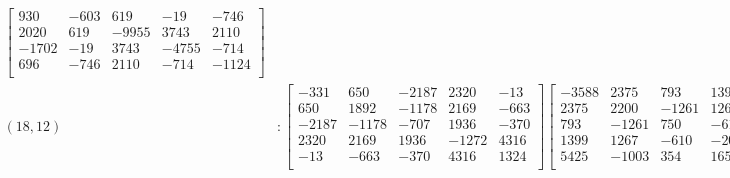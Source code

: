 \documentclass[12pt]{amsart}
\theoremstyle{plain}
\theoremstyle{definition}
\begin{document}
\begin{landscape}
\begin{align*}
\begin{bmatrix}
 930  &   -603  &   619  &   -19  &   -746  \\ 
 2020  &   619  &   -9955  &   3743  &   2110  \\ 
 -1702  &   -19  &   3743  &   -4755  &   -714  \\ 
 696  &   -746  &   2110  &   -714  &   -1124  \\ 
\end{bmatrix}
\\
(18,12) &:
\begin{bmatrix}
-331  &   650  &   -2187  &   2320  &   -13  \\ 
 650  &   1892  &   -1178  &   2169  &   -663  \\ 
 -2187  &   -1178  &   -707  &   1936  &   -370  \\ 
 2320  &   2169  &   1936  &   -1272  &   4316  \\ 
 -13  &   -663  &   -370  &   4316  &   1324  \\ 
\end{bmatrix}
\begin{bmatrix}
-3588  &   2375  &   793  &   1399  &   5425  \\ 
 2375  &   2200  &   -1261  &   1267  &   -1003  \\ 
 793  &   -1261  &   750  &   -610  &   354  \\ 
 1399  &   1267  &   -610  &   -2090  &   1653  \\ 
 5425  &   -1003  &   354  &   1653  &   187  \\ 
\end{bmatrix}
\begin{bmatrix}
-130  &   -870  &   1109  &   1931  &   1964  \\ 
 -870  &   -2593  &   -1417  &   5921  &   1096  \\ 
 1109  &   -1417  &   -697  &   1811  &   859  \\ 
 1931  &   5921  &   1811  &   -3819  &   1541  \\ 
 1964  &   1096  &   859  &   1541  &   3012  \\ 
\end{bmatrix}
\begin{bmatrix}
-1378  &   -700  &   259  &   -1187  &   -1420  \\ 
 -700  &   -2857  &   982  &   -821  &   -331  \\ 
 259  &   982  &   -1505  &   -410  &   -1374  \\ 
 -1187  &   -821  &   -410  &   -1470  &   -2103  \\ 
 -1420  &   -331  &   -1374  &   -2103  &   -3473  \\ 
\end{bmatrix}
\\
\end{align*} 
\end{landscape}
\end{document}
